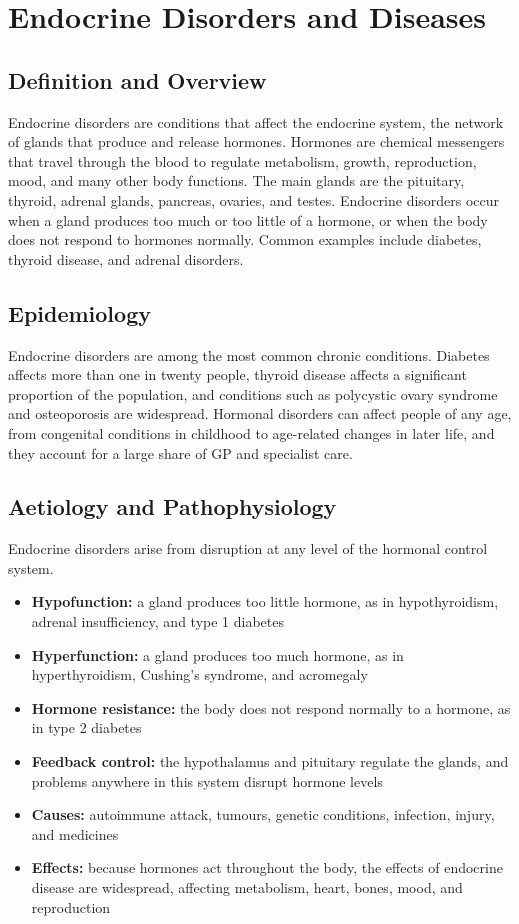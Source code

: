 \chapter{Endocrine Disorders and Diseases}

\section*{Definition and Overview}
Endocrine disorders are conditions that affect the endocrine system, the network of glands that produce and release hormones. Hormones are chemical messengers that travel through the blood to regulate metabolism, growth, reproduction, mood, and many other body functions. The main glands are the pituitary, thyroid, adrenal glands, pancreas, ovaries, and testes. Endocrine disorders occur when a gland produces too much or too little of a hormone, or when the body does not respond to hormones normally. Common examples include diabetes, thyroid disease, and adrenal disorders.

\section*{Epidemiology}
Endocrine disorders are among the most common chronic conditions. Diabetes affects more than one in twenty people, thyroid disease affects a significant proportion of the population, and conditions such as polycystic ovary syndrome and osteoporosis are widespread. Hormonal disorders can affect people of any age, from congenital conditions in childhood to age-related changes in later life, and they account for a large share of GP and specialist care.

\section*{Aetiology and Pathophysiology}
Endocrine disorders arise from disruption at any level of the hormonal control system.
\begin{itemize}
    \item \textbf{Hypofunction:} a gland produces too little hormone, as in hypothyroidism, adrenal insufficiency, and type 1 diabetes
    \item \textbf{Hyperfunction:} a gland produces too much hormone, as in hyperthyroidism, Cushing's syndrome, and acromegaly
    \item \textbf{Hormone resistance:} the body does not respond normally to a hormone, as in type 2 diabetes
    \item \textbf{Feedback control:} the hypothalamus and pituitary regulate the glands, and problems anywhere in this system disrupt hormone levels
    \item \textbf{Causes:} autoimmune attack, tumours, genetic conditions, infection, injury, and medicines
    \item \textbf{Effects:} because hormones act throughout the body, the effects of endocrine disease are widespread, affecting metabolism, heart, bones, mood, and reproduction
\end{itemize}


